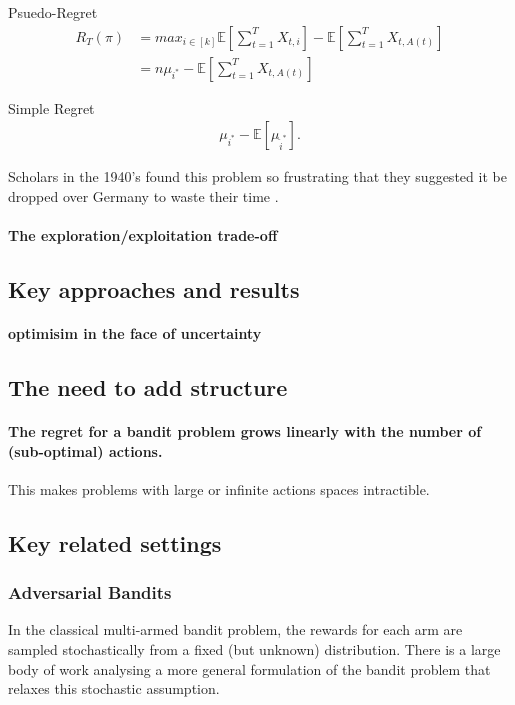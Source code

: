 \documentclass[11pt,a4paper,oneside]{book}
\newcommand{\E}[1]{\mathbb E\left[{#1}\right]}
\newcommand{\eqn}[1]{\begin{align}#1\end{align}}
\begin{document}
Psuedo-Regret
\eqn{
R_T(\pi) &= max_{i \in [k]}\E{\sum_{t=1}^T{X_{t,i}}} - \E{\sum_{t=1}^T{X_{t,A(t)}}} \\
&= n\mu_{i^*} - \E{\sum_{t=1}^T{X_{t,A(t)}}}
}

Simple Regret
\eqn{
\mu_{i^*} - \E{\mu_{\hat i^*}}.
}


Scholars in the 1940's found this problem so frustrating that they suggested it be dropped over Germany to waste their time \cite{XXX}. 

\paragraph*{The exploration/exploitation trade-off}

\subsection*{Key approaches and results}
\paragraph*{optimisim in the face of uncertainty}

\subsection*{The need to add structure}
\paragraph*{The regret for a bandit problem grows linearly with the number of (sub-optimal) actions.} This makes problems with large or infinite actions spaces intractible.

\subsection*{Key related settings}

\subsubsection*{Adversarial Bandits}
In the classical multi-armed bandit problem, the rewards for each arm are sampled stochastically from a fixed (but unknown) distribution. There is a large body of work analysing a more general formulation of the bandit problem that relaxes this stochastic assumption. 
\end{document}
